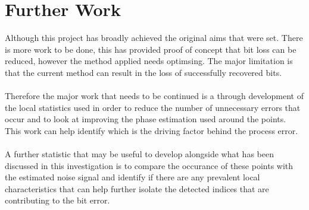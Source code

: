 \section{Further Work}

Although this project has broadly achieved the original aims that were set. There is more work to be done, this has provided proof of concept that bit loss can be reduced, however the method applied needs optimsing. The major limitation is that the current method can result in the loss of successfully recovered bits. 
\\\\
Therefore the major work that needs to be continued is a through development of the local statistics used in order to reduce the number of unnecessary errors that occur and to look at improving the phase estimation used around the points. This work can help identify which is the driving factor behind the process error.
\\\\
A further statistic that may be useful to develop alongside what has been discussed in this investigation is to compare the occurance of these points with the estimated noise signal and identify if there are any prevalent local characteristics that can help further isolate the detected indices that are contributing to the bit error.